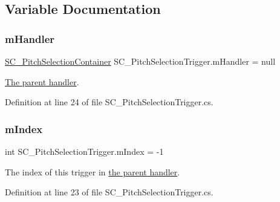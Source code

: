 \subsection{Variable Documentation}
\mbox{\label{group___s_c___p_s_t_priv_var_ga23cf7134e224e9718a99949979cd5078}} 
\subsubsection{\texorpdfstring{m\+Handler}{mHandler}}
{\footnotesize\ttfamily \hyperlink{class_s_c___pitch_selection_container}{S\+C\+\_\+\+Pitch\+Selection\+Container} S\+C\+\_\+\+Pitch\+Selection\+Trigger.\+m\+Handler = null\hspace{0.3cm}{\ttfamily [private]}}



\hyperlink{group___doc_s_c___p_s_c}{The parent handler}. 



Definition at line 24 of file S\+C\+\_\+\+Pitch\+Selection\+Trigger.\+cs.

\mbox{\label{group___s_c___p_s_t_priv_var_ga7d7771170c1f6cb1d6a9eb41e96a478f}} 
\subsubsection{\texorpdfstring{m\+Index}{mIndex}}
{\footnotesize\ttfamily int S\+C\+\_\+\+Pitch\+Selection\+Trigger.\+m\+Index = -\/1\hspace{0.3cm}{\ttfamily [private]}}



The index of this trigger in \hyperlink{group___doc_s_c___p_s_c}{the parent handler}. 



Definition at line 23 of file S\+C\+\_\+\+Pitch\+Selection\+Trigger.\+cs.

\mbox{\label{group___s_c___p_s_t_priv_var_ga1ecd33f50c82f6ffda81850438907a31}} 
